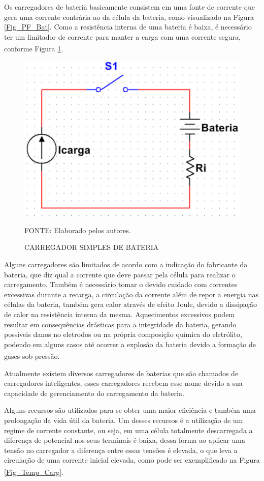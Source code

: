 \documentclass[
	12pt,				%
	openright,			%
	oneside,			%
	a4paper,			%
	english,			%
	french,				%
	spanish,			%
	brazil,				%
	oldfontcommands
	]{abntex2}
\begin{document}
	Os carregadores de bateria basicamente consistem em uma fonte de corrente que gera uma corrente contrária ao da célula da bateria, como visualizado na Figura \ref{Fig_PF_Bat}. Como a resistência interna de uma bateria é baixa, é necessário ter um limitador de corrente para manter a carga com uma corrente segura, conforme Figura \ref{Fig_Carregador}.\textsuperscript{\cite{carregador}}
	
	\begin{figure}[th]
		\caption{CARREGADOR SIMPLES DE BATERIA}
		\label{Fig_Carregador}
		\centering
		\includegraphics[width=0.5\linewidth]{./figs/carregador}
			
		\begin{small}
			FONTE: Elaborado pelos autores.
		\end{small}		
	\end{figure}
	\pagebreak
	
	Alguns carregadores são limitados de acordo com a indicação do fabricante da bateria, que diz qual a corrente que deve passar pela célula para realizar o carregamento. Também é necessário tomar o devido cuidado com correntes excessivas durante a recarga, a circulação da corrente além de repor a energia nas células da bateria, também gera calor através de efeito Joule, devido a dissipação de calor na resistência interna da mesma. Aquecimentos excessivos podem resultar em consequências drásticas para a integridade da bateria, gerando possíveis danos no eletrodos ou na própria composição química do eletrólito, podendo em alguns casos até ocorrer a explosão da bateria devido a formação de gases sob pressão.\textsuperscript{\cite{carregador}}
	
	Atualmente existem diversos carregadores de baterias que são chamados de carregadores inteligentes, esses carregadores recebem esse nome devido a sua capacidade de gerenciamento do carregamento da bateria.
	
	Alguns recursos são utilizados para se obter uma maior eficiência e também uma prolongação da vida útil da bateria. Um desses recursos é a utilização de um regime de corrente constante, ou seja, em uma célula totalmente descarregada a diferença de potencial nos seus terminais é baixa, dessa forma ao aplicar uma tensão no carregador a diferença entre essas tensões é elevada, o que leva a circulação de uma corrente inicial elevada, como pode ser exemplificado na Figura \ref{Fig_Temp_Carg}.\textsuperscript{\cite{carregador}}
	
\end{document}
